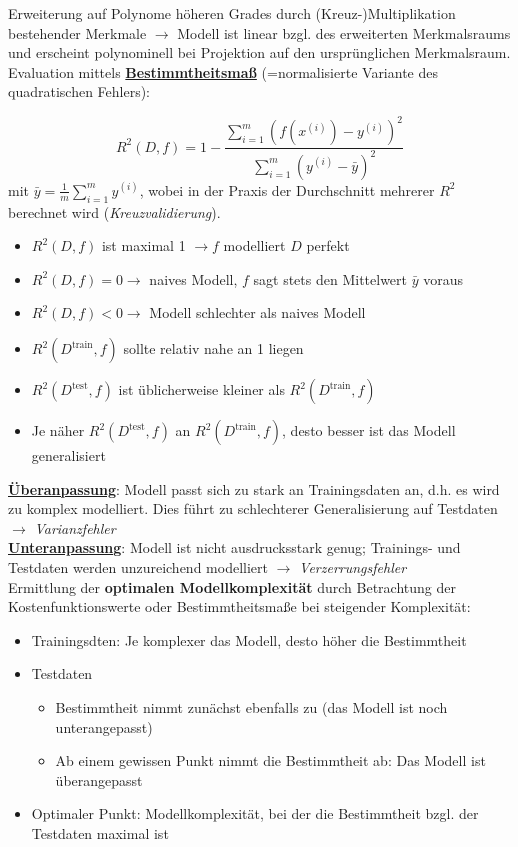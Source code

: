 Erweiterung auf Polynome höheren Grades durch (Kreuz-)Multiplikation bestehender Merkmale $\rightarrow$ Modell ist linear bzgl. des erweiterten Merkmalsraums und erscheint polynominell bei Projektion auf den ursprünglichen Merkmalsraum.\\

Evaluation  mittels \textbf{\underline{Bestimmtheitsmaß}} (=normalisierte Variante des quadratischen Fehlers):

\begin{equation*}
    R^2(D,f) = 1 - \frac{\sum_{i=1}^{m}(f(x^{(i)}) - y^{(i)})^2}{\sum_{i=1}^{m}(y^{(i)} - \bar{y})^2}
\end{equation*} mit $\bar{y} = \frac{1}{m}\sum_{i=1}^{m}y^{(i)}$, wobei in der Praxis der Durchschnitt mehrerer $R^2$ berechnet wird (\emph{Kreuzvalidierung}).

\begin{itemize}
    \item $R^2(D,f)$  ist maximal 1 $\rightarrow f$ modelliert $D$ perfekt
    \item $R^2(D,f) = 0 \rightarrow$ naives Modell, $f$ sagt stets den Mittelwert $\bar{y}$ voraus
    \item $R^2(D,f) < 0 \rightarrow$ Modell schlechter als naives Modell
    \item $R^2(D^{\text{train}},f)$ sollte relativ nahe an 1 liegen
    \item $R^2(D^{\text{test}},f)$ ist üblicherweise kleiner als $R^2(D^{\text{train}},f)$
    \item Je näher $R^2(D^{\text{test}},f)$ an $R^2(D^{\text{train}},f)$, desto besser ist das Modell generalisiert
\end{itemize}

\underline{\textbf{Überanpassung}}: Modell passt sich zu stark an Trainingsdaten an, d.h. es wird zu komplex modelliert. Dies führt zu schlechterer Generalisierung auf Testdaten $\rightarrow$ \emph{Varianzfehler}\\

\underline{\textbf{Unteranpassung}}: Modell ist nicht ausdrucksstark genug; Trainings- und Testdaten werden unzureichend modelliert $\rightarrow$ \emph{Verzerrungsfehler}\\

Ermittlung der \textbf{optimalen Modellkomplexität} durch Betrachtung der Kostenfunktionswerte oder Bestimmtheitsmaße bei steigender Komplexität:
\begin{itemize}
    \item Trainingsdten: Je komplexer das Modell, desto höher die Bestimmtheit
    \item Testdaten
    \begin{itemize}
        \item Bestimmtheit nimmt zunächst ebenfalls zu (das Modell ist noch unterangepasst)
        \item Ab einem gewissen Punkt nimmt die Bestimmtheit ab: Das Modell ist überangepasst
    \end{itemize}
    \item Optimaler Punkt: Modellkomplexität, bei der die Bestimmtheit bzgl. der Testdaten maximal ist
\end{itemize}

